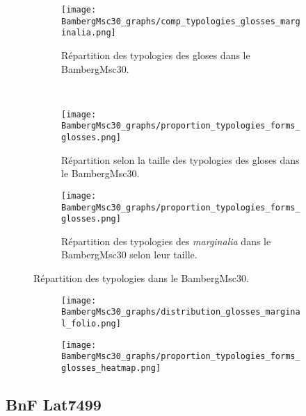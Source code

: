 \documentclass[a4paper, twoside, 12pt]{book}
\begin{document}
{\begin{figure}[H]
\centering
\begin{subfigure}{0.80\textwidth}
  \centering
  \texttt{[image: BambergMsc30\_graphs/comp\_typologies\_glosses\_marginalia.png]}
  \caption{Répartition des typologies des gloses dans le BambergMsc30.}
\end{subfigure}
\\
\hfill
\begin{subfigure}{0.45\textwidth}
  \centering
  \texttt{[image: BambergMsc30\_graphs/proportion\_typologies\_forms\_glosses.png]}
 \caption{Répartition selon la taille des typologies des gloses dans le BambergMsc30.}
\end{subfigure}
\begin{subfigure}{0.45\textwidth}
  \centering
  \texttt{[image: BambergMsc30\_graphs/proportion\_typologies\_forms\_glosses.png]}
    \caption{Répartition des typologies des \textit{marginalia} dans le BambergMsc30 selon leur taille.}
  \label{fig:Bambergtypologies_marginalia}
\end{subfigure}
\caption{Répartition des typologies dans le BambergMsc30.}
\label{fig:Bambergtypologies}
\end{figure}

\begin{figure}
  \centering
  
  \begin{subfigure}{\textwidth}
    \centering
    \texttt{[image: BambergMsc30\_graphs/distribution\_glosses\_marginal\_folio.png]}
  \end{subfigure}
  
  \vspace{0.5cm} %
  
  \begin{subfigure}{\textwidth}
    \centering
    \texttt{[image: BambergMsc30\_graphs/proportion\_typologies\_forms\_glosses\_heatmap.png]}
  \end{subfigure}

\end{figure}


\subsection{BnF Lat7499}

}
\end{document}
